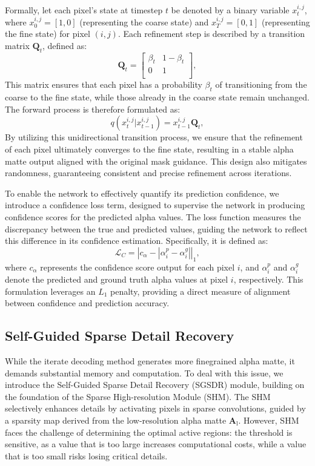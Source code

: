 Formally, let each pixel’s state at timestep \( t \) be denoted by a binary variable \( x_t^{i,j} \), where \( x^{i,j}_0 = [1, 0] \) (representing the coarse state) and \( x^{i,j}_T = [0, 1] \) (representing the fine state) for pixel \((i, j)\). Each refinement step is described by a transition matrix \( \mathbf{Q}_t \), defined as:
\[
\mathbf{Q}_t = 
\begin{bmatrix}
\beta_t & 1 - \beta_t \\
0 & 1 \\
\end{bmatrix},
\]
This matrix ensures that each pixel has a probability \( \beta_t \) of transitioning from the coarse to the fine state, while those already in the coarse state remain unchanged. The forward process is therefore formulated as:
\[
q(x_{t}^{i,j}|x_{t-1}^{i,j}) = x_{t-1}^{i,j} \mathbf{Q}_{t},
\]
By utilizing this unidirectional transition process, we ensure that the refinement of each pixel ultimately converges to the fine state, resulting in a stable alpha matte output aligned with the original mask guidance. This design also mitigates randomness, guaranteeing consistent and precise refinement across iterations.

To enable the network to effectively quantify its prediction confidence, we introduce a confidence loss term, designed to supervise the network in producing confidence scores for the predicted alpha values. The loss function measures the discrepancy between the true and predicted values, guiding the network to reflect this difference in its confidence estimation. Specifically, it is defined as:
\[
\mathcal{L}_C = \left| c_{\alpha} - \left| \alpha_i^p - \alpha_i^g \right| \right|_1,
\]
where \( c_{\alpha} \) represents the confidence score output for each pixel \( i \), and \( \alpha_i^p \) and \( \alpha_i^g \) denote the predicted and ground truth alpha values at pixel \( i \), respectively. This formulation leverages an \( L_1 \) penalty, providing a direct measure of alignment between confidence and prediction accuracy.
\subsection{Self-Guided Sparse Detail Recovery}
\label{sec:decoder}
While the iterate decoding method generates more finegrained alpha matte, it demands substantial memory and computation. To deal with this issue, we introduce the Self-Guided Sparse Detail Recovery (SGSDR) module, building on the foundation of the Sparse High-resolution Module\cite{sun2023sparsemat} (SHM). The SHM selectively enhances details by activating pixels in sparse convolutions, guided by a sparsity map derived from the low-resolution alpha matte \( \mathbf{A}_{\text{l}} \). However, SHM faces the challenge of determining the optimal active regions: the threshold is sensitive, as a value that is too large increases computational costs, while a value that is too small risks losing critical details.


